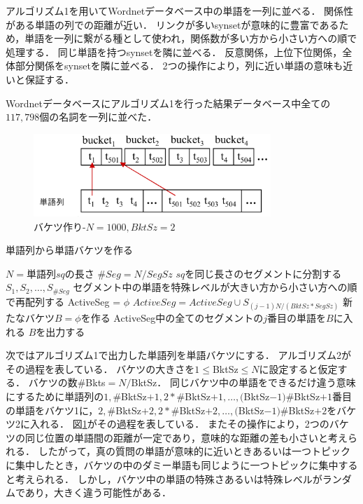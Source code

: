 \documentclass{jsarticle}
\theoremstyle{definition}
\begin{document}
アルゴリズム1を用いてWordnetデータベース中の単語を一列に並べる．
関係性がある単語の列での距離が近い．
リンクが多いsynsetが意味的に豊富であるため，単語を一列に繋がる種として使われ，関係数が多い方から小さい方への順で処理する．
同じ単語を持つsynsetを隣に並べる．
反意関係，上位下位関係，全体部分関係をsynsetを隣に並べる．
2つの操作により，列に近い単語の意味も近いと保証する．

Wordnetデータベースにアルゴリズム1を行った結果データベース中全ての$117,798$個の名詞を一列に並べた．

\begin{figure}[!hbp]
    \centering
    \includegraphics[width=0.8\textwidth,natwidth=5677,natheight=1982]{rk11.png}
	\caption{バケツ作り-$N=1000,BktSz=2$}\label{fig:pp1}
\end{figure}

\begin{algorithm}
\caption{単語列から単語バケツを作る}
\begin{algorithmic}[1]
	\State $N=$単語列$sq$の長さ
	\State $\#Seg=N/SegSz$
	\State $sq$を同じ長さのセグメントに分割する$S_1,S_2, \dots , S_{\#Seg}$
	\State セグメント中の単語を特殊レベルが大きい方から小さい方への順で再配列する
	\State ActiveSeg = $\phi$
		\State $ActiveSeg = ActiveSeg \cup S_{(j-1)N/(BktSz * SegSz)}$
		\EndFor
		\State 新たなバケツ$B=\phi$を作る
		\State ActiveSeg中の全てのセグメントの$j$番目の単語を$B$に入れる
		\State $B$を出力する
		\EndFor
	\EndFor
\EndFunction
\end{algorithmic}
\end{algorithm}

次ではアルゴリズム1で出力した単語列を単語バケツにする．
アルゴリズム2がその過程を表している．
バケツの大きさを$1 \leq$BktSz$\leq N$に設定すると仮定する．
バケツの数\#Bkts$=N/$BktSz．
同じバケツ中の単語をできるだけ違う意味にするために単語列の$1,\#$BktSz$+1,2*\#$BktSz$+1, \dots,($BktSz$-1)\#$BktSz$+1$番目の単語をバケツ1に，$2,\#$BktSz$+2,2*\#$BktSz$+2, \dots,($BktSz$-1)\#$BktSz$+2$をバケツ2に入れる．
図\ref{fig:pp1}がその過程を表している．
またその操作により，2つのバケツの同じ位置の単語間の距離が一定であり，意味的な距離の差も小さいと考えられる．
したがって，真の質問の単語が意味的に近いときあるいは一つトピックに集中したとき，バケツの中のダミー単語も同じように一つトピックに集中すると考えられる．
しかし，バケツ中の単語の特殊さあるいは特殊レベルがランダムであり，大きく違う可能性がある．
\end{document}
